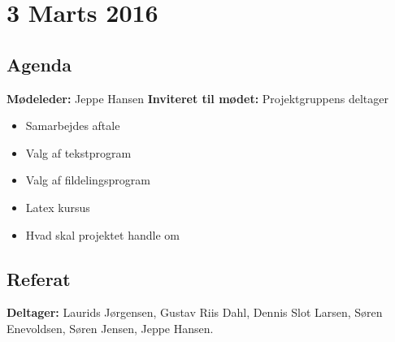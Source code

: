 \chapter*{3 Marts 2016}

\section*{Agenda}

\textbf{Mødeleder:} Jeppe Hansen
\textbf{Inviteret til mødet:} Projektgruppens deltager

\begin{itemize}
	\item Samarbejdes aftale
	\item Valg af tekstprogram
	\item Valg af fildelingsprogram
	\item Latex kursus
	\item Hvad skal projektet handle om
\end{itemize}

\section*{Referat}

\textbf{Deltager:} Laurids Jørgensen, Gustav Riis Dahl, Dennis Slot Larsen, Søren Enevoldsen, Søren Jensen, Jeppe Hansen.





